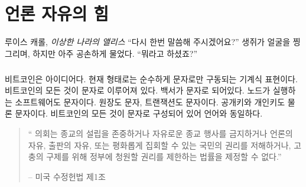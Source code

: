 \chapter{언론 자유의 힘}
\label{les:6}

\begin{chapquote}{루이스 캐롤, \textit{이상한 나라의 앨리스}}
	\enquote{다시 한번 말씀해 주시겠어요?} 생쥐가 얼굴을 찡그리며, 하지만 아주 공손하게 물었다. \enquote{뭐라고 하셨죠?}
\end{chapquote}

\paragraph{}
비트코인은 아이디어다. 현재 형태로는 순수하게 문자로만 구동되는 기계식 표현이다.
비트코인의 모든 것이 문자로 이루어져 있다. 백서가 문자로 되어있다. 노드가 실행하는 소프트웨어도 문자이다. 원장도 문자, 트랜잭션도 문자이다. 
공개키와 개인키도 물론 문자이다. 비트코인의 모든 것이 문자로 구성되어 있어 언어와 동일하다.

\begin{quotation}\begin{samepage}
		\enquote{
			의회는 종교의 설립을 존중하거나 자유로운 종교 행사를 금지하거나 
			언론의 자유, 출판의 자유, 또는 평화롭게 집회할 수 있는 국민의 권리를 저해하거나,  
			고충의 구제를 위해 정부에 청원할 권리를 제한하는 법률을 제정할 수 없다.}
		\begin{flushright} -- 미국 수정헌법 제1조
\end{flushright}\end{samepage}\end{quotation}

